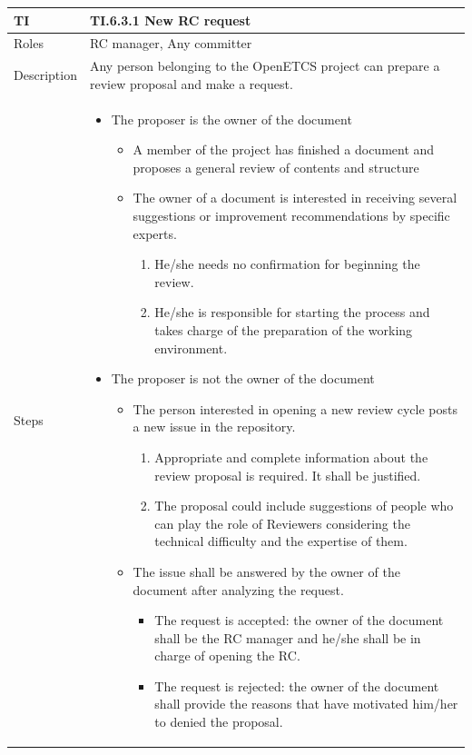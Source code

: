 \documentclass{template/openetcs_article}
\begin{document}
\begin{flushleft}
\tablefirsthead{}
\tablehead{}
\tabletail{}
\tablelasttail{}
\begin{supertabular}{|m{2cm}|m{13cm}|}
\hline
{}
TI & 
TI.6.3.1 New RC request
\\\hline
Roles &
RC manager, 
Any committer
\\\hline
Description &
Any person belonging to the OpenETCS project can prepare a review proposal and make a request. 
\\\hline
Steps &
\begin{itemize}
\item The proposer is the owner of the document
\begin{itemize}
\item A member of the project has finished a document and proposes a general review of contents and structure
\item The owner of a document is interested in receiving several suggestions or improvement recommendations by specific experts. 
\begin{enumerate}
\item He/she needs no confirmation for beginning the review. 
\item He/she is responsible for starting the process and takes charge of the preparation of the working environment. 
\end{enumerate}
\end{itemize}
\item The proposer is not the owner of the document
\begin{itemize}
\item The person interested in opening a new review cycle posts a new issue in the repository. 
\begin{enumerate}
\item Appropriate and complete information about the review proposal is required. It shall be justified.
\item The proposal could include suggestions of people who can play the role of Reviewers considering the technical difficulty and the expertise of them.
\end{enumerate}
\item The issue shall be answered by the owner of the document after analyzing the request. 
\begin{itemize}
\item The request is accepted: the owner of the document shall be the RC manager and he/she shall be in charge of opening the RC.
\item The request is rejected: the owner of the document shall provide the reasons that have motivated him/her to denied the proposal. 
\end{itemize}
\end{itemize}
\end{itemize}
\\\hline
\end{supertabular}
\end{flushleft}
\end{document}

